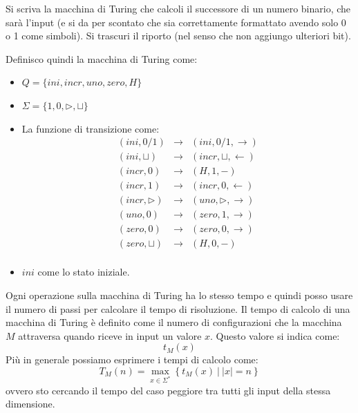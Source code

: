 \begin{esempio} 
    Si scriva la macchina di Turing che calcoli il successore di un numero binario,
    che sarà l'input (e si da per scontato che sia correttamente formattato avendo
    solo 0 o 1 come simboli). Si trascuri il riporto (nel senso che non aggiungo
    ulteriori bit).

    Definisco quindi la macchina di Turing come:
    \begin{itemize}
        \item $Q = \{ini, incr, uno, zero, H\}$
        \item $\Sigma = \{1, 0, \triangleright, \sqcup\}$
        \item La funzione di transizione come:
              \begin{equation}
                  \begin{array}{lcl}
                      (ini, 0 / 1)           & \to & (ini, 0 / 1, \to)          \\
                      (ini, \sqcup)          & \to & (incr, \sqcup, \gets)      \\
                      (incr, 0)              & \to & (H, 1, -)                  \\
                      (incr, 1)              & \to & (incr, 0, \gets)           \\
                      (incr, \triangleright) & \to & (uno, \triangleright, \to) \\
                      (uno, 0)               & \to & (zero, 1, \to)             \\
                      (zero, 0)              & \to & (zero, 0, \to)             \\
                      (zero, \sqcup)         & \to & (H, 0, -)                  \\
                  \end{array}
              \end{equation}
        \item $ini$ come lo stato iniziale.
    \end{itemize}
\end{esempio}
Ogni operazione sulla macchina di Turing ha lo stesso tempo e quindi posso usare
il numero di passi per calcolare il tempo di risoluzione. Il tempo di calcolo di
una macchina di Turing è definito come il numero di configurazioni che la macchina
$M$ attraversa quando riceve in input un valore $x$. Questo valore si indica come:
\begin{equation}
    t_M(x)
\end{equation}
Più in generale possiamo esprimere i tempi di calcolo come:
\begin{equation}
    T_M(n) = \max_{x \in \Sigma^{\ast}} \left\{t_M(x) \ | \ |x| = n \right\}
\end{equation}
ovvero sto cercando il tempo del caso peggiore tra tutti gli input della stessa
dimensione.
